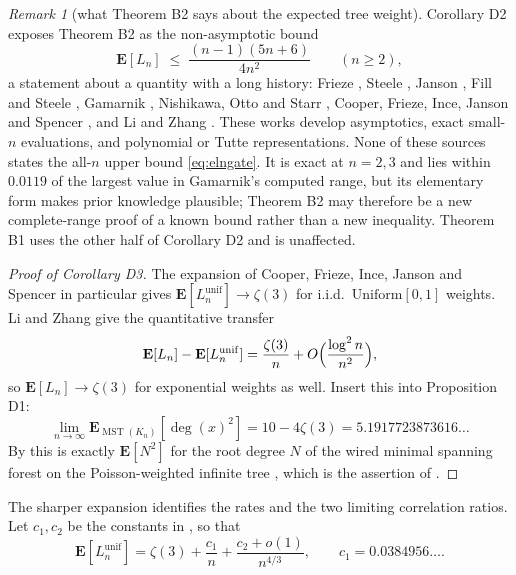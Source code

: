 \documentclass[11pt,a4paper]{amsart}
\theoremstyle{plain}
\theoremstyle{definition}
\theoremstyle{remark}
\newtheorem{remark}[theorem]{Remark}
\newcommand{\MST}{\operatorname{MST}}
\newcommand{\E}{\mathbf{E}}
\DeclareMathOperator{\dg}{deg}
\begin{document}
\begin{remark}[what Theorem B2 says about the expected tree weight]
\label{rem:eln}
Corollary D2 exposes Theorem B2 as the non-asymptotic bound
\begin{equation}
\label{eq:elngate}
\E[L_n]\;\le\;\frac{(n-1)(5n+6)}{4n^2}\qquad(n\ge2),
\end{equation}
a statement about a quantity with a long history: Frieze \cite{Frieze}, Steele
\cite{Steele}, Janson \cite{Janson}, Fill and Steele \cite{FillSteele}, Gamarnik
\cite{Gamarnik}, Nishikawa, Otto and Starr \cite{NOS}, Cooper, Frieze, Ince,
Janson and Spencer \cite{CFIJS}, and Li and Zhang \cite{LiZhang}. These works
develop asymptotics, exact small-$n$ evaluations, and polynomial or Tutte
representations. None of these sources states the all-$n$ upper bound
\eqref{eq:elngate}. It is exact at $n=2,3$ and lies within
$0.0119$ of the largest value in Gamarnik's computed range, but its elementary
form makes prior knowledge plausible; Theorem B2 may therefore be a new
complete-range proof of a known bound rather than a new inequality. Theorem B1
uses the other half of Corollary D2 and is unaffected.
\end{remark}

\begin{proof}[Proof of Corollary D3]
The expansion of Cooper, Frieze, Ince, Janson and Spencer \cite{CFIJS} in
particular gives $\E[L_n^{\mathrm{unif}}]\to\zeta(3)$ for i.i.d.\
$\mathrm{Uniform}[0,1]$ weights. Li and Zhang \cite{LiZhang} give the
quantitative transfer
\begin{equation}
\label{eq:lizhang}
\E[L_n]-\E[L_n^{\mathrm{unif}}]=\frac{\zeta(3)}n
+O\Bigl(\frac{\log^2n}{n^2}\Bigr),
\end{equation}
so $\E[L_n]\to\zeta(3)$ for exponential weights as well. Insert this into
Proposition D1:
\[
\lim_{n\to\infty}\E_{\MST(K_n)}[\dg(x)^2]=10-4\zeta(3)=5.1917723873616\ldots
\]
By \cite[Proposition 3.11]{TZ} this is exactly $\E[N^2]$ for the root degree $N$
of the wired minimal spanning forest on the Poisson-weighted infinite tree
\cite{NT}, which is the assertion of \cite[Question 3.8]{TZ}.
\end{proof}

The sharper expansion identifies the rates and the two limiting correlation
ratios. Let $c_1,c_2$ be the constants in \cite[Theorem 1]{CFIJS}, so that
\begin{equation}
\label{eq:uniform-expansion}
\E[L_n^{\mathrm{unif}}]
=\zeta(3)+\frac{c_1}{n}+\frac{c_2+o(1)}{n^{4/3}},
\qquad c_1=0.0384956\ldots .
\end{equation}
\end{document}
